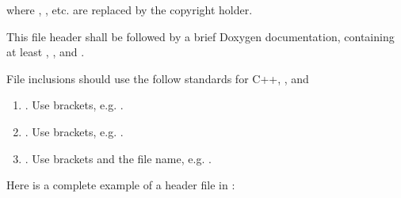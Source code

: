 \documentclass[letterpaper,10pt,english]{sphinxmanual}
\begin{document}
\begin{sphinxVerbatim}[commandchars=\\\{\},formatcom=\scriptsize]
\end{sphinxVerbatim}

\sphinxAtStartPar
where , , etc. are replaced by the copyright holder.

\sphinxAtStartPar
This file header shall be followed by a brief Doxygen documentation, containing at least , , and .

\sphinxAtStartPar
File inclusions should use the follow standards for C++, , and 
\begin{enumerate}
%
\item {} 
\sphinxAtStartPar
{}. Use brackets, e.g. .

\item {} 
\sphinxAtStartPar
{}. Use brackets, e.g. .

\item {} 
\sphinxAtStartPar
{}. Use brackets and the file name, e.g. .

\end{enumerate}

\sphinxAtStartPar
Here is a complete example of a header file in :
\end{document}
